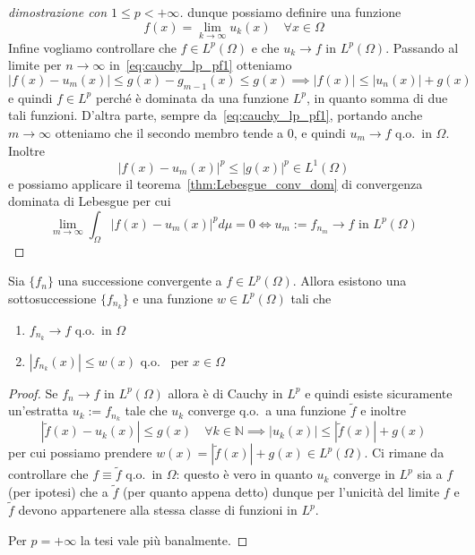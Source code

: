 \begin{proof}[dimostrazione con \(1 \le p < +\infty\)]
dunque possiamo definire una funzione
\[
    f(x) = \lim_{k\to \infty} u_{k}{(x)} \quad \forall x \in \Omega 
\]
Infine vogliamo controllare che \(f \in L^{p}{(\Omega)}\) e che \(u_k \to f\) in
\(L^{p}{(\Omega)}\). Passando al limite per \(n\to \infty\)
in~\eqref{eq:cauchy_lp_pf1} otteniamo
\[
    |f(x) - u_{m}{(x)}| \le g(x) - g_{m-1}{(x)} \le g(x)
    \implies 
    |f(x)| \le |u_{n}{(x)}| + g{(x)} 
\]
e quindi \(f \in L^{p}\) perché è dominata da una funzione \(L^{p}\), in quanto
somma di due tali funzioni. D'altra parte, sempre da~\eqref{eq:cauchy_lp_pf1}, portando
anche \(m\to \infty\) otteniamo che il secondo membro tende a 0, e quindi
\(u_{m}\to f\) q.o.~in \(\Omega\). Inoltre
\[
    \left| f(x) - u_{m}{(x)} \right|^{p} \le \left| g{(x)} \right|^{p}
    \in L^{1}{(\Omega)}
\]
e possiamo applicare il teorema~\ref{thm:Lebesgue_conv_dom} di convergenza
dominata di Lebesgue per cui
\[
    \lim_{m\to \infty} \int_{\Omega} \left| f(x) - u_{m}(x) \right|^{p} d\mu = 0
    \iff u_{m} := f_{n_{m}} \to f \text{ in } L^{p}{(\Omega)}
\]
\end{proof} %
\begin{corollary}\label{cor:conv_lp_sottosucc}
    Sia \(\{f_{n}\} \) una successione convergente a \(f \in L^{p}{(\Omega)}\).
    Allora esistono una sottosuccessione \(\{f_{n_k}\} \) e una funzione \(w \in
    L^{p}{(\Omega)}\) tali che 
\begin{enumerate}[label = \arabic*.]
    \item \(f_{n_k} \to f\) q.o.~in \(\Omega\)
    \item \(\left| f_{n_k} {(x)} \right| \le w{(x)} \) q.o.~ per \(x \in \Omega\)
\end{enumerate}
\end{corollary}
\begin{proof}
    Se \(f_{n}\to f\) in \(L^{p}{(\Omega)}\) allora è di Cauchy in \(L^{p}\) e
    quindi esiste sicuramente un'estratta \(u_k := f_{n_k} \) tale che \(u_k\)
    converge q.o.~a una funzione \(\tilde{f}\) e inoltre
\[
    \left| \tilde{f}{(x)} - u_k{(x)} \right| \le g(x) \quad \forall k \in
    \mathbb{N} \implies 
    \left| u_k{(x)} \right| \le \left| \tilde{f}{(x)} \right| +g{(x)}
\]
per cui possiamo prendere \(w{(x)} = \left| \tilde{f}{(x)} \right| + g{(x)} \in
L^{p}{(\Omega)}\). Ci rimane da controllare che \(f \equiv \tilde{f}\) q.o.~in
$\Omega$: questo è vero in quanto \(u_k\) converge in \(L^{p}\) sia a \(f\) (per
ipotesi) che a \(\tilde{f}\) (per quanto appena detto) dunque per l'unicità del
limite \(f \) e \(\tilde{f}\) devono appartenere alla stessa classe di funzioni
in \(L^{p}\).

Per \(p=+\infty\) la tesi vale più banalmente.
\end{proof}

